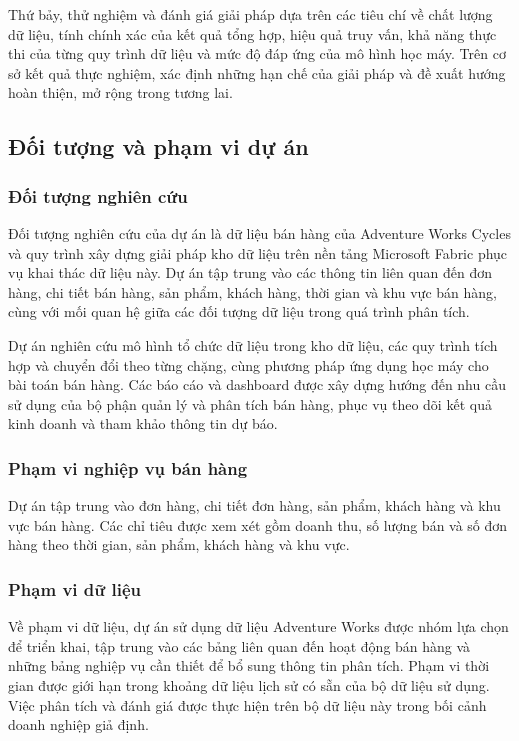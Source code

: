Thứ bảy, thử nghiệm và đánh giá giải pháp dựa trên các tiêu chí về chất lượng dữ liệu, tính chính xác của kết quả tổng hợp, hiệu quả truy vấn, khả năng thực thi của từng quy trình dữ liệu và mức độ đáp ứng của mô hình học máy. Trên cơ sở kết quả thực nghiệm, xác định những hạn chế của giải pháp và đề xuất hướng hoàn thiện, mở rộng trong tương lai.

\subsection{Đối tượng và phạm vi dự án}

\subsubsection{Đối tượng nghiên cứu}

Đối tượng nghiên cứu của dự án là dữ liệu bán hàng của Adventure Works Cycles và quy trình xây dựng giải pháp kho dữ liệu trên nền tảng Microsoft Fabric phục vụ khai thác dữ liệu này. Dự án tập trung vào các thông tin liên quan đến đơn hàng, chi tiết bán hàng, sản phẩm, khách hàng, thời gian và khu vực bán hàng, cùng với mối quan hệ giữa các đối tượng dữ liệu trong quá trình phân tích.

Dự án nghiên cứu mô hình tổ chức dữ liệu trong kho dữ liệu, các quy trình tích hợp và chuyển đổi theo từng chặng, cùng phương pháp ứng dụng học máy cho bài toán bán hàng. Các báo cáo và dashboard được xây dựng hướng đến nhu cầu sử dụng của bộ phận quản lý và phân tích bán hàng, phục vụ theo dõi kết quả kinh doanh và tham khảo thông tin dự báo.

\subsubsection{Phạm vi nghiệp vụ bán hàng}
Dự án tập trung vào đơn hàng, chi tiết đơn hàng, sản phẩm, khách hàng và khu vực bán hàng. Các chỉ tiêu được xem xét gồm doanh thu, số lượng bán và số đơn hàng theo thời gian, sản phẩm, khách hàng và khu vực.

\subsubsection{Phạm vi dữ liệu}

Về phạm vi dữ liệu, dự án sử dụng dữ liệu Adventure Works được nhóm lựa chọn để triển khai, tập trung vào các bảng liên quan đến hoạt động bán hàng và những bảng nghiệp vụ cần thiết để bổ sung thông tin phân tích. Phạm vi thời gian được giới hạn trong khoảng dữ liệu lịch sử có sẵn của bộ dữ liệu sử dụng. Việc phân tích và đánh giá được thực hiện trên bộ dữ liệu này trong bối cảnh doanh nghiệp giả định.

